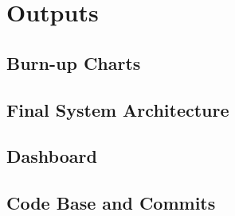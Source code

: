 \section{Outputs}

  \subsection{Burn-up Charts}
  \label{sec:burnup}

  \subsection{Final System Architecture}

  \subsection{Dashboard}

  \subsection{Code Base and Commits}

\newpage
